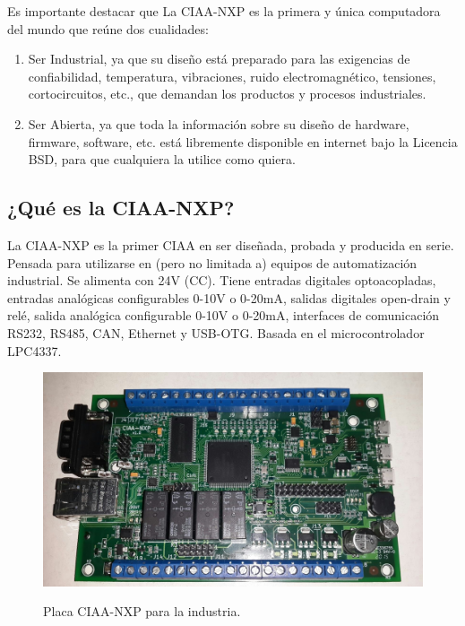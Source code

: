 Es importante destacar que La CIAA-NXP es la primera y única computadora del mundo que reúne dos cualidades:

\begin{enumerate}
  \item Ser Industrial, ya que su diseño está preparado para las exigencias de confiabilidad, temperatura, vibraciones, ruido electromagnético, tensiones, cortocircuitos, etc., que demandan los productos y procesos industriales.
  \item Ser Abierta, ya que toda la información sobre su diseño de hardware, firmware, software, etc. está libremente disponible en internet bajo la Licencia BSD, para que cualquiera la utilice como quiera.
\end{enumerate}

\subsection{¿Qué es la CIAA-NXP?}

La CIAA-NXP es la primer CIAA en ser diseñada, probada y producida en serie. Pensada para utilizarse en (pero no limitada a) equipos de automatización industrial. Se alimenta con 24V (CC). Tiene entradas digitales optoacopladas, entradas analógicas configurables 0-10V o 0-20mA, salidas digitales open-drain y relé, salida analógica configurable 0-10V o 0-20mA, interfaces de comunicación RS232, RS485, CAN, Ethernet y USB-OTG. Basada en el microcontrolador LPC4337. 

\begin{figure}
  \centering
  \includegraphics[scale=.2]{./Figures/ciaa.png}
  \label{fig:ciaa}
  \caption{Placa CIAA-NXP para la industria.}
\end{figure}

